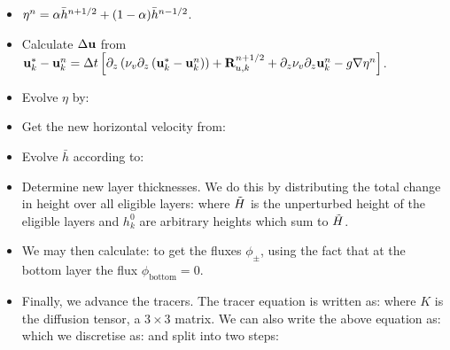 \documentclass[10pt]{article}
\begin{document}
 			\begin{itemize}
 				\item $\eta^{n} = \alpha \bar{h}^{n+1/2} + (1-\alpha)\bar{h}^{n-1/2}$.
 				\item Calculate $\Delta \mathbf{u}$ from $\mathbf{u}^{*}_{k} - \mathbf{u}^{n}_{k}  = \Delta t\left[\partial_{z}\left(\nu_{v}\partial_{z}\left(\mathbf{u}^{*}_{k} - \mathbf{u}^{n}_{k}\right)\right) + \mathbf{R}_{u,k}^{n+1/2} + \partial_{z}\nu_{v}\partial_{z}\mathbf{u}^{n}_{k} - g\nabla\eta^{n}\right]$.
 				\item Evolve $\eta$ by:
 			\item Get the new horizontal velocity from:
 				\item Evolve $\bar{h}$ according to:
 			\item Determine new layer thicknesses. We do this by distributing the total change in height over all eligible layers:
 						where $\tilde{H}$ is the unperturbed height of the eligible layers and $h^{0}_{k}$ are arbitrary heights which sum to $\tilde{H}$.
 			\item We may then calculate:
 				to get the fluxes $\phi_{\pm}$, using the fact that at the bottom layer the flux $\phi_{\text{bottom}} = 0$.
 				\item Finally, we advance the tracers. The tracer equation is written as:
 					where $K$ is the diffusion tensor, a $3\times 3$ matrix. We can also write the above equation as:
 					which we discretise as:
 					and split into two steps:
 			\end{itemize}
 			
\end{document}
